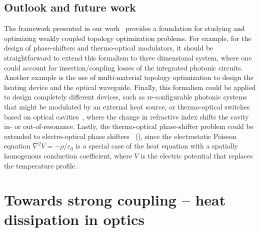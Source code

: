\subsection*{Outlook and future work}

The framework presented in our work~\cite{ownpub0} provides a foundation for studying and optimizing weakly coupled topology optimization problems. For example, for the design of phase-shifters and thermo-optical modulators, it should be straightforward to extend this
formalism to three dimensional system, where one could account for insertion/coupling losses of the integrated photonic circuits. Another example is the use of multi-material topology optimization to design the heating device and the optical waveguide. Finally, this formalism could be applied to design completely different devices, such as re-configurable photonic systems that might be modulated by an external heat source, or thermo-optical
switches based on optical cavities~\cite{switch, switch_2}, where the change in refractive index shifts the cavity in- or out-of-resonance. Lastly, the thermo-optical phase-shifter problem could be
extended to electro-optical phase shifters~\cite{pockels} (), since the electrostatic Poisson equation $\nabla^2 V = -\rho/\varepsilon_0$ is a special case of the heat equation with a spatially homogenous
conduction coefficient, where $V$ is the electric potential that replaces the temperature profile. 

\section{Towards strong coupling -- heat dissipation in optics}\label{sec:thermo_strong_coupling}

